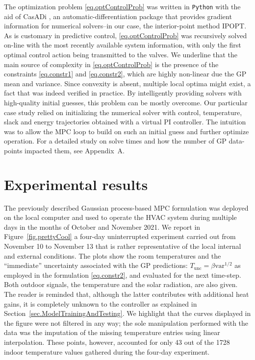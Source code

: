 The optimization problem \eqref{eq.optControlProb} was written in \texttt{Python} with the aid of CasADi \cite{casadi}, an automatic-differentiation package that provides gradient information for numerical solvers--in our case, the interior-point method IPOPT. As is customary in predictive control, \eqref{eq.optControlProb} was recursively solved on-line with the most recently available system information, with only the first optimal control action being transmitted to the valves. We underline that the main source of complexity in \eqref{eq.optControlProb} is the presence of the constraints \eqref{eq.constr1} and \eqref{eq.constr2}, which are highly non-linear due the GP mean and variance. Since convexity is absent, multiple local optima might exist, a fact that was indeed verified in practice. By intelligently providing solvers with high-quality initial guesses, this problem can be mostly overcome. Our particular case study relied on initializing the numerical solver with control, temperature, slack and energy trajectories obtained with a virtual PI controller. The intuition was to allow the MPC loop to build on such an initial guess and further optimize operation. For a detailed study on solve times and how the number of GP data-points impacted them, see Appendix~A.


\section{Experimental results}


The previously described Gaussian process-based MPC formulation was deployed on the local computer and used to operate the HVAC system during multiple days in the months of October and November 2021. We report in Figure~\ref{fig.prettyCool} a four-day uninterrupted experiment carried out from November 10 to November 13 that is rather representative of the local internal and external conditions. The plots show the room temperatures and the ``immediate'' uncertainty associated with the GP predictions: $T_\text{unc} = \beta \text{var}^{1/2}$ as employed in the formulation \eqref{eq.constr2}, and evaluated for the next time-step. Both outdoor signals, the temperature and the solar radiation, are also given. The reader is reminded that, although the latter contributes with additional heat gains, it is completely unknown to the controller as explained in Section~\ref{sec.ModelTrainingAndTesting}. We highlight that the curves displayed in the figure were not filtered in any way; the sole manipulation performed with the data was the imputation of the missing temperature entries using linear interpolation. These points, however, accounted for only 43 out of the 1728 indoor temperature values gathered during the four-day experiment.

